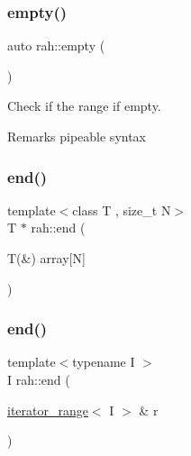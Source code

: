 \subsubsection{\texorpdfstring{empty()}{empty()}\hspace{0.1cm}{\footnotesize\ttfamily [2/2]}}
{\footnotesize\ttfamily auto rah\+::empty (\begin{DoxyParamCaption}{ }\end{DoxyParamCaption})\hspace{0.3cm}{\ttfamily [inline]}}



Check if the range if empty. 

\begin{DoxyRemark}{Remarks}
pipeable syntax
\end{DoxyRemark}

\begin{DoxyCodeInclude}{0}
\end{DoxyCodeInclude}
\mbox{\label{namespacerah_a20a3e45aee90bb5534a00c6b14e06069}} 
\subsubsection{\texorpdfstring{end()}{end()}\hspace{0.1cm}{\footnotesize\ttfamily [1/3]}}
{\footnotesize\ttfamily template$<$class T , size\+\_\+t N$>$ \\
T $\ast$ rah\+::end (\begin{DoxyParamCaption}\item[{T(\&)}]{array\mbox{[}\+N\mbox{]} }\end{DoxyParamCaption})\hspace{0.3cm}{\ttfamily [noexcept]}}

\mbox{\label{namespacerah_aaddd1442cd76b96876e692cdefe7261d}} 
\subsubsection{\texorpdfstring{end()}{end()}\hspace{0.1cm}{\footnotesize\ttfamily [2/3]}}
{\footnotesize\ttfamily template$<$typename I $>$ \\
I rah\+::end (\begin{DoxyParamCaption}\item[{\mbox{\hyperlink{structrah_1_1iterator__range}{iterator\+\_\+range}}$<$ I $>$ \&}]{r }\end{DoxyParamCaption})}



